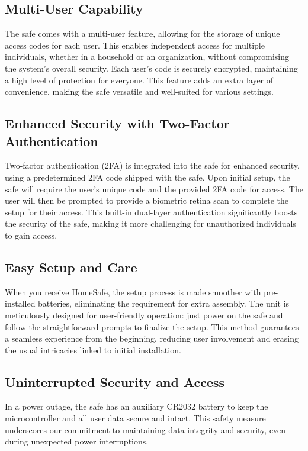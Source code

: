\documentclass{article}
\begin{document}
\subsection{Multi-User Capability}
The safe comes with a multi-user feature, allowing for the storage of unique access codes for each user. This enables independent access for multiple individuals, whether in a household or an organization, without compromising the system's overall security. Each user's code is securely encrypted, maintaining a high level of protection for everyone. This feature adds an extra layer of convenience, making the safe versatile and well-suited for various settings.

\subsection{Enhanced Security with Two-Factor Authentication}
Two-factor authentication (2FA) is integrated into the safe for enhanced security, using a predetermined 2FA code shipped with the safe. Upon initial setup, the safe will require the user's unique code and the provided 2FA code for access. The user will then be prompted to provide a biometric retina scan to complete the setup for their access. This built-in dual-layer authentication significantly boosts the security of the safe, making it more challenging for unauthorized individuals to gain access.

\subsection{Easy Setup and Care}

When you receive HomeSafe, the setup process is made smoother with pre-installed batteries, eliminating the requirement for extra assembly. The unit is meticulously designed for user-friendly operation: just power on the safe and follow the straightforward prompts to finalize the setup. This method guarantees a seamless experience from the beginning, reducing user involvement and erasing the usual intricacies linked to initial installation.

\subsection{Uninterrupted Security and Access}
In a power outage, the safe has an auxiliary CR2032 battery to keep the microcontroller and all user data secure and intact. This safety measure underscores our commitment to maintaining data integrity and security, even during unexpected power interruptions.
\end{document}
